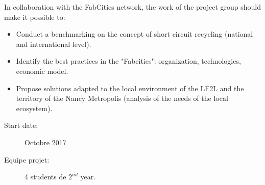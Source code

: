 \begin{tcolorbox}
In collaboration with the FabCities network, the work of the project group should make it possible to:

	\begin{itemize}
		\item Conduct a benchmarking on the concept of short circuit recycling (national and international level).
		\item Identify the best practices in the "Fabcities": organization, technologies, economic model.
		\item Propose solutions adapted to the local environment of the LF2L and the territory of the  Nancy Metropolis (analysis of the needs of the local ecosystem).

	\end{itemize}

\tcbline
	\begin{description}
		\item[Start date:] Octobre 2017
		\item[Equipe projet:] 4 students  de  $2^{nd}$ year.
	\end{description}

\end{tcolorbox}
\newpage


